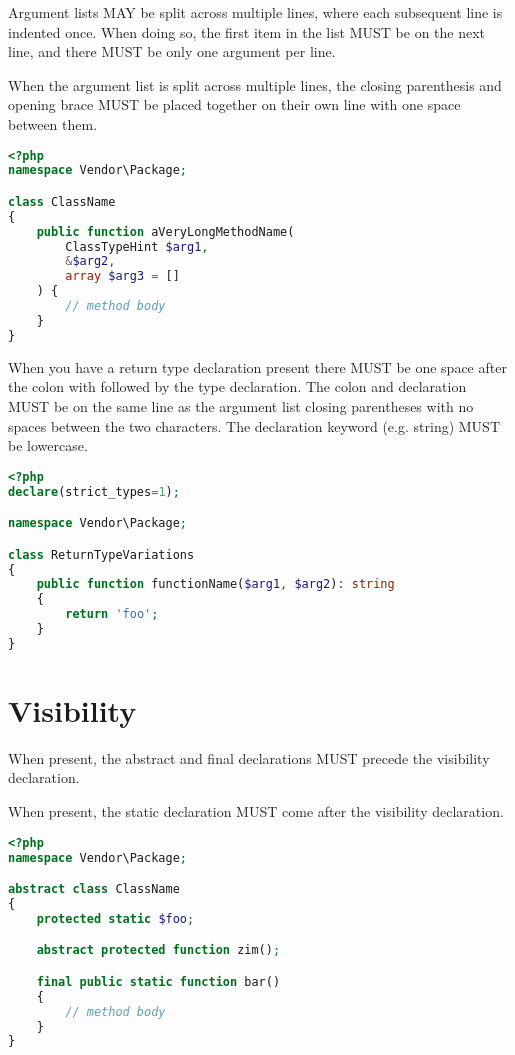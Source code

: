 Argument lists MAY be split across multiple lines, where each subsequent line is indented once. When doing so, the first item in the list MUST be on the next line, and there MUST be only one argument per line.

When the argument list is split across multiple lines, the closing parenthesis and opening brace MUST be placed together on their own line with one space between them.




\begin{lstlisting}[language=PHP]
<?php
namespace Vendor\Package;

class ClassName
{
    public function aVeryLongMethodName(
        ClassTypeHint $arg1,
        &$arg2,
        array $arg3 = []
    ) {
        // method body
    }
}
\end{lstlisting}



When you have a return type declaration present there MUST be one space after the colon with followed by the type declaration. The colon and declaration MUST be on the same line as the argument list closing parentheses with no spaces between the two characters. The declaration keyword (e.g. string) MUST be lowercase.




\begin{lstlisting}[language=PHP]
<?php
declare(strict_types=1);

namespace Vendor\Package;

class ReturnTypeVariations
{
    public function functionName($arg1, $arg2): string
    {
        return 'foo';
    }
}
\end{lstlisting}


\section{Visibility}



When present, the abstract and final declarations MUST precede the visibility declaration.

When present, the static declaration MUST come after the visibility declaration.

\begin{lstlisting}[language=PHP]
<?php
namespace Vendor\Package;

abstract class ClassName
{
    protected static $foo;

    abstract protected function zim();

    final public static function bar()
    {
        // method body
    }
}
\end{lstlisting}

